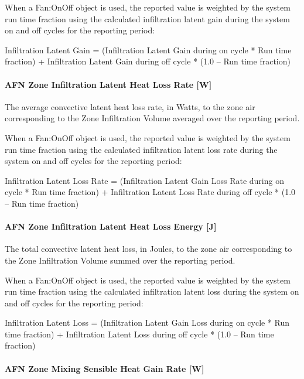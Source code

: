 When a Fan:OnOff object is used, the reported value is weighted by the system run time fraction using the calculated infiltration latent gain during the system on and off cycles for the reporting period:

Infiltration Latent Gain = (Infiltration Latent Gain during on cycle * Run time fraction) + Infiltration Latent Gain during off cycle * (1.0 -- Run time fraction)

\paragraph{AFN Zone Infiltration Latent Heat Loss Rate {[}W{]}}\label{afn-zone-infiltration-latent-heat-loss-rate-w}

The average convective latent heat loss rate, in Watts, to the zone air corresponding to the Zone Infiltration Volume averaged over the reporting period.

When a Fan:OnOff object is used, the reported value is weighted by the system run time fraction using the calculated infiltration latent loss rate during the system on and off cycles for the reporting period:

Infiltration Latent Loss Rate = (Infiltration Latent Gain Loss Rate during on cycle * Run time fraction) + Infiltration Latent Loss Rate during off cycle * (1.0 -- Run time fraction)

\paragraph{AFN Zone Infiltration Latent Heat Loss Energy {[}J{]}}\label{afn-zone-infiltration-latent-heat-loss-energy-j}

The total convective latent heat loss, in Joules, to the zone air corresponding to the Zone Infiltration Volume summed over the reporting period.

When a Fan:OnOff object is used, the reported value is weighted by the system run time fraction using the calculated infiltration latent loss during the system on and off cycles for the reporting period:

Infiltration Latent Loss = (Infiltration Latent Gain Loss during on cycle * Run time fraction) + Infiltration Latent Loss during off cycle * (1.0 -- Run time fraction)

\paragraph{AFN Zone Mixing Sensible Heat Gain Rate {[}W{]}}\label{afn-zone-mixing-sensible-heat-gain-rate-w}

